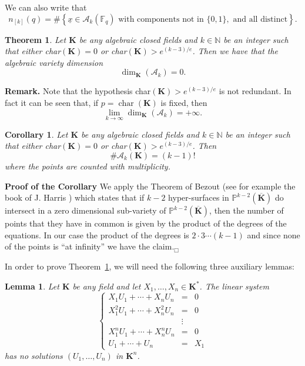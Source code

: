 \documentclass[a4paper,twoside]{article}
\newtheorem{Theorem}{Theorem}[section]
\newtheorem{Lemma}{Lemma}[section]
\newtheorem{Corollary}{Corollary}[section]
\begin{document}
We can also write that
\begin{equation}\label{citato}
n_{[k]}(q)=\# \left\{\underline{x}\in\mathcal A_{k}(\mathbb F_q)
\text{ with components not in } \{0,1\}, \text{ and all
distinct}\right\}.
\end{equation}

\begin{Theorem}\label{Lucia} Let $\mathbf K$ be any algebraic closed fields
and $k\in \mathbb N$ be an integer such that either char$(\mathbf K)=0$
or char$(\mathbf K)> e^{(k-3)/e}$.
Then we have that the algebraic variety dimension
$$\dim_{\mathbf K}(\mathcal A_k)=0.$$
\end{Theorem}

\noindent\textbf{Remark.} Note that the hypothesis char$(\mathbf K)> e^{(k-3)/e}$ is not redundant.
In fact it can be seen that, if $p=\operatorname{char}(\mathbf K)$
is fixed, then
$$\lim_{k\rightarrow\infty}\dim_{\mathbf K}(\mathcal A_k)=+\infty.$$
\medskip

\begin{Corollary} Let $\mathbf K$ be any algebraic closed fields
and $k\in \mathbb N$ be an integer such that either char$(\mathbf
K)=0$ or char$(\mathbf K)> e^{(k-3)/e}$. Then
$$\#\mathcal A_k({\mathbf K})= (k-1)!$$
where the points are counted with multiplicity.
\end{Corollary}

\noindent\textbf{Proof of the Corollary} We apply the Theorem of
Bezout (see for example the book of J. Harris \cite{Har}) which
states that if $k-2$ hyper-surfaces in $\mathbb
P^{k-2}(\overline{\mathbf K})$ do intersect in a zero dimensional
sub-variety of  $\mathbb P^{k-2}(\overline{\mathbf K})$, then the
number of points that they have in common is given by the product
of the degrees of the equations. In our case the product of the
degrees is $2\cdot3\cdots (k-1)$ and since none of the points is
``at infinity'' we have the claim.\hfill$_\Box$\medskip

In order to prove Theorem~\ref{Lucia}, we will need the following
three auxiliary lemmas:

\begin{Lemma} \label{luciachi} Let $\mathbf K$ be any field and let
$X_1,\ldots,X_n\in\mathbf K^*$.
The linear system
$$
\left\{\begin{array}{rcl}
X_1U_1+\cdots+X_nU_n & = & 0\\
X_1^2U_1+\cdots+X_n^2U_n & = & 0\\
 &\vdots & \\
X_1^nU_1+\cdots+X_n^nU_n & = & 0\\
U_1+\cdots+U_n &=&X_1
\end{array}\right.$$
has no solutions $(U_1,\ldots,U_n)$ in $\mathbf K^n$.
\end{Lemma}
\end{document}
